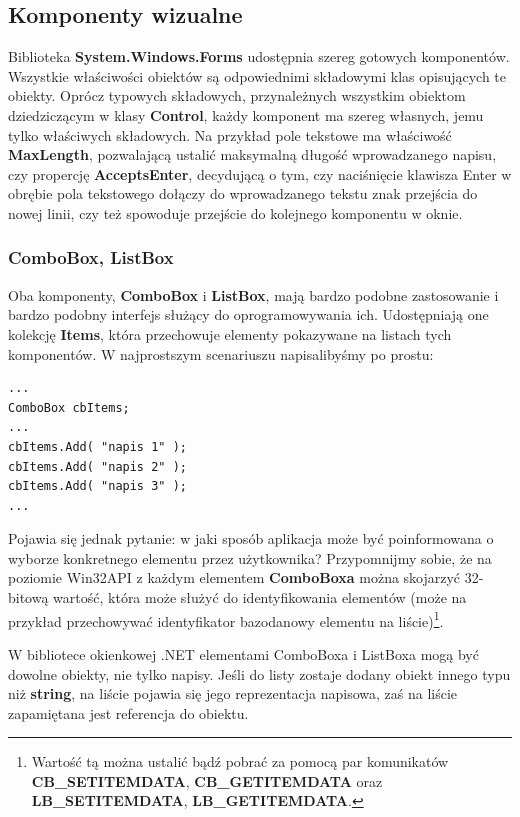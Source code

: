 ﻿\subsection{Komponenty wizualne}

Biblioteka {\bf System.Windows.Forms} udostępnia szereg gotowych komponentów. Wszystkie właściwości
obiektów są odpowiednimi składowymi klas opisujących te obiekty. Oprócz typowych składowych, przynależnych
wszystkim obiektom dziedziczącym w klasy {\bf Control}, każdy komponent ma szereg własnych, jemu tylko
właściwych składowych. Na przykład pole tekstowe ma właściwość {\bf MaxLength}, pozwalającą ustalić maksymalną
długość wprowadzanego napisu, czy propercję {\bf AcceptsEnter}, decydującą o tym, czy naciśnięcie klawisza
Enter w obrębie pola tekstowego dołączy do wprowadzanego tekstu znak przejścia do nowej linii, czy też
spowoduje przejście do kolejnego komponentu w oknie.

\subsubsection{ComboBox, ListBox}

Oba komponenty, {\bf ComboBox} i {\bf ListBox}, mają bardzo podobne zastosowanie i bardzo podobny interfejs
służący do oprogramowywania ich. Udostępniają one kolekcję
{\bf Items}, która przechowuje elementy pokazywane na listach tych komponentów. W najprostszym scenariuszu
napisalibyśmy po prostu:

\begin{scriptsize}
\begin{verbatim}
...
ComboBox cbItems;
...
cbItems.Add( "napis 1" );
cbItems.Add( "napis 2" );
cbItems.Add( "napis 3" );
...
\end{verbatim}
\end{scriptsize}

Pojawia się jednak pytanie: w jaki sposób aplikacja może być poinformowana o wyborze konkretnego
elementu przez użytkownika? Przypomnijmy sobie, że na poziomie Win32API z każdym elementem {\bf ComboBoxa} można
skojarzyć 32-bitową wartość, która może służyć do identyfikowania elementów (może na przykład przechowywać
identyfikator bazodanowy elementu na liście)\footnote{Wartość tą można ustalić bądź pobrać za pomocą par 
komunikatów {\bf CB\_SETITEMDATA}, {\bf CB\_GETITEMDATA} oraz {\bf LB\_SETITEMDATA}, {\bf LB\_GETITEMDATA}.}.

W bibliotece okienkowej .NET elementami ComboBoxa i ListBoxa mogą być dowolne obiekty, nie tylko napisy.
Jeśli do listy zostaje dodany obiekt innego typu niż {\bf string}, na liście pojawia się jego reprezentacja
napisowa, zaś na liście zapamiętana jest referencja do obiektu. 


